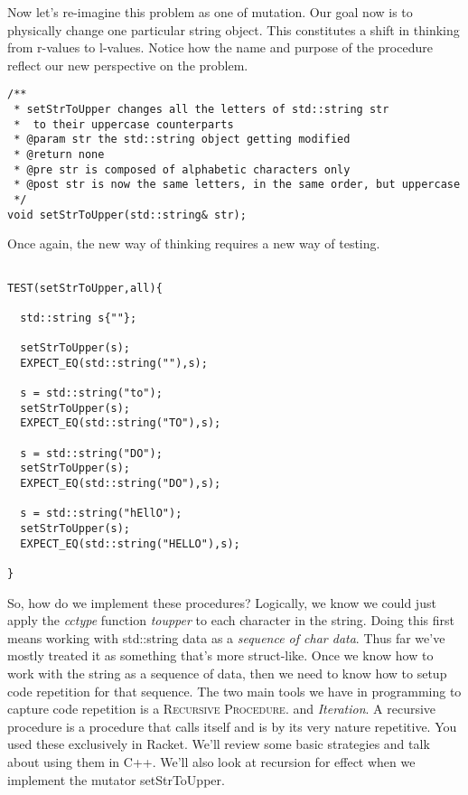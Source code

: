 \documentclass[]{tufte-handout}
\begin{document}
Now let's re-imagine this problem as one of mutation. Our goal now is to physically change one particular string object.  This constitutes a shift in thinking from r-values to l-values. Notice how the name and purpose of the procedure reflect our new perspective on the problem.
\begin{verbatim}
/** 
 * setStrToUpper changes all the letters of std::string str
 *  to their uppercase counterparts 
 * @param str the std::string object getting modified 
 * @return none
 * @pre str is composed of alphabetic characters only
 * @post str is now the same letters, in the same order, but uppercase 
 */
void setStrToUpper(std::string& str);
\end{verbatim}

Once again, the new way of thinking requires a new way of testing.
\begin{verbatim}

TEST(setStrToUpper,all){

  std::string s{""};
  
  setStrToUpper(s);
  EXPECT_EQ(std::string(""),s);
  
  s = std::string("to");
  setStrToUpper(s);
  EXPECT_EQ(std::string("TO"),s);

  s = std::string("DO");
  setStrToUpper(s);
  EXPECT_EQ(std::string("DO"),s);
  
  s = std::string("hEllO");
  setStrToUpper(s);
  EXPECT_EQ(std::string("HELLO"),s);

}

\end{verbatim}

So, how do we implement these procedures?  Logically, we know we could just apply the \textit{cctype} function \textit{toupper} to each character in the string. Doing this first means working with std::string data as a \textit{sequence of char data}. Thus far we've mostly treated it as something that's more struct-like. Once we know how to work with the string as a sequence of data, then we need to know how to setup code repetition for that sequence. The two main tools we have in programming to capture code repetition is a \textsc{Recursive Procedure}. and \textit{Iteration}.  A recursive procedure is a procedure that calls itself and is by its very nature repetitive. You used these exclusively in Racket. We'll review some basic strategies and talk about using them in C++. We'll also look at recursion for effect when we implement the mutator setStrToUpper.  
\end{document}

